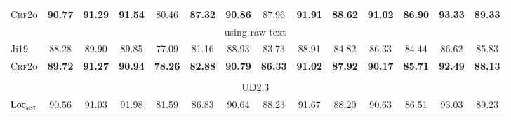 \begin{table*}[tb]
\begin{tabularx}{\textwidth}{lccccccccccccc}
        \textsc{Crf2o}                & \textbf{90.77} & \textbf{91.29} & \textbf{91.54}\rlap{$^\dagger$}  & 80.46                           & \textbf{87.32}\rlap{$^\dagger$} & \textbf{90.86}\rlap{$^\dagger$}  & 87.96                           & \textbf{91.91}\rlap{$^\ddagger$} & \textbf{88.62}\rlap{$^\ddagger$} & \textbf{91.02}\rlap{$^\dagger$} & \textbf{86.90}\rlap{$^\ddagger$} & \textbf{93.33}\rlap{$^\ddagger$} & \textbf{89.33}\rlap{$^\ddagger$} \\[1pt]
        \multicolumn{14}{c}{using raw text}                                                                                                                                                                                                                                                                                                                                                                                                                          \\[1pt]
        Ji19                          & 88.28          & 89.90          & 89.85                            & 77.09                           & 81.16                           & 88.93                            & 83.73                           & 88.91                            & 84.82                            & 86.33                           & 84.44                            & 86.62                            & 85.83                            \\
        \textsc{Crf2o}                & \textbf{89.72} & \textbf{91.27} & \textbf{90.94}                   & \textbf{78.26}                  & \textbf{82.88}                  & \textbf{90.79}                   & \textbf{86.33}                  & \textbf{91.02}                   & \textbf{87.92}                   & \textbf{90.17}                  & \textbf{85.71}                   & \textbf{92.49}                   & \textbf{88.13}                   \\
        \hline
        \\[-15pt]
        \multicolumn{14}{c}{UD2.3}                                                                                                                                                                                                                                                                                                                                                                                                                                   \\[1pt]
        $\textsc{Loc}_{\textsc{mst}}$ & 90.56          & 91.03          & 91.98                            & 81.59                           & 86.83                           & 90.64                            & 88.23                           & 91.67                            & 88.20                            & 90.63                           & 86.51                            & 93.03                            & 89.23                            \\

\end{tabularx}
\end{table*}
